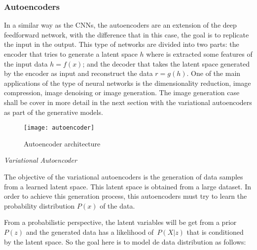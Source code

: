 \subsubsection{Autoencoders}

In a similar way as the CNNs, the autoencoders are an extension of the deep feedforward network, with the difference that in this case, the goal is to replicate the input in the output. This type of networks are divided into two parts: the encoder that tries to generate a latent space \begin{math}h\end{math} where is extracted some features of the input data \begin{math} h = f(x) \end{math}; and the decoder that takes the latent space generated by the encoder as input and reconstruct the data \begin{math} r = g(h) \end{math}. One of the main applications of the type of neural networks is the dimensionality reduction, image compression, image denoising or image generation. The image generation case shall be cover in more detail in the next section with the variational autoencoders as part of the generative models.

\begin{figure}[htb]
  \centering
  \texttt{[image: autoencoder]}
  \caption[Autoencoder architecture]{Autoencoder architecture}
  \label{fig:autoencoder}
\end{figure}

\textit{Variational Autoencoder}

The objective of the variational autoencoders \cite{Kingma2014} is the generation of data samples from a learned latent space. This latent space is obtained from a large dataset. In order to achieve this generation process, this autoencoders must try to learn the probability distribution \begin{math} P(x) \end{math} of the data.

From a probabilistic perspective, the latent variables will be get from a prior \begin{math} P(z) \end{math} and the generated data has a likelihood of \begin{math} P(X|z) \end{math} that is conditioned by the latent space. So the goal here is to model de data distribution as follows:

